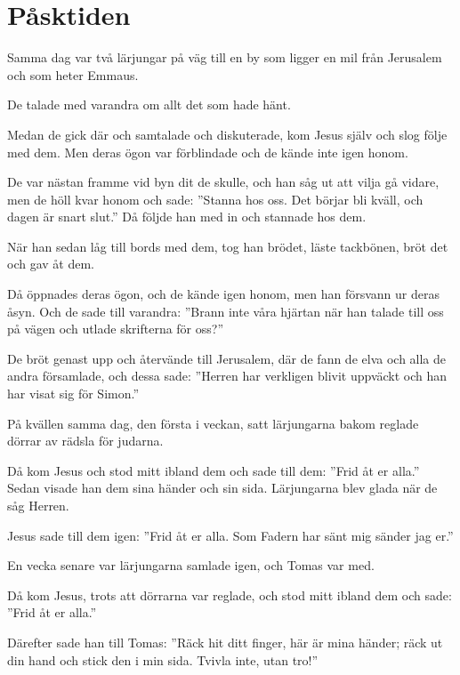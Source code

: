 \newpage
\section{Påsktiden}

{Samma dag var två lärjungar på väg till en by som ligger en mil från Jerusalem och som heter Emmaus.}

 De talade med varandra om allt det som hade hänt. 
 
Medan de gick där och samtalade och diskuterade, kom Jesus själv och slog följe med dem. Men deras ögon var förblindade och de kände inte igen honom. 

De var nästan framme vid byn dit de skulle, och han såg ut att vilja gå vidare, men de höll kvar honom och sade: ''Stanna hos oss. Det börjar bli kväll, och dagen är snart slut.'' Då följde han med in och stannade hos dem. 

När han sedan låg till bords med dem, tog han brödet, läste tackbönen, bröt det och gav åt dem. 

Då öppnades deras ögon, och de kände igen honom, men han försvann ur deras åsyn. Och de sade till varandra: ''Brann inte våra hjärtan när han talade till oss på vägen och utlade skrifterna för oss?''

De bröt genast upp och återvände till Jerusalem, där de fann de elva och alla de andra församlade, och dessa sade: ''Herren har verkligen blivit uppväckt och han har visat sig för Simon.''


{På kvällen samma dag, den första i veckan, satt lärjungarna bakom reglade dörrar av rädsla för judarna.}

 Då kom Jesus och stod mitt ibland dem och sade till dem: ''Frid åt er alla.'' Sedan visade han dem sina händer och sin sida. Lärjungarna blev glada när de såg Herren. 
 
Jesus sade till dem igen: ''Frid åt er alla. Som Fadern har sänt mig sänder jag er.''


{En vecka senare var lärjungarna samlade igen, och Tomas var med.} 

Då kom Jesus, trots att dörrarna var reglade, och stod mitt ibland dem och sade: ''Frid åt er alla.'' 

Därefter sade han till Tomas: ''Räck hit ditt finger, här är mina händer; räck ut din hand och stick den i min sida. Tvivla inte, utan tro!'' 

